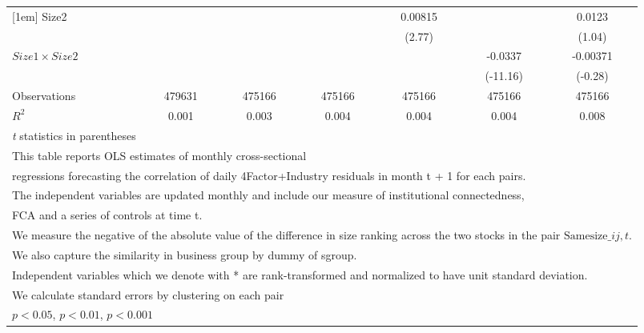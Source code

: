 {\begin{tabular}{l*{6}{c}}
[1em]
Size2               &                     &                     &                     &     0.00815\sym{**} &                     &      0.0123         \\
                    &                     &                     &                     &      (2.77)         &                     &      (1.04)         \\
[1em]
$ Size1 \times Size2 $&                     &                     &                     &                     &     -0.0337\sym{***}&    -0.00371         \\
                    &                     &                     &                     &                     &    (-11.16)         &     (-0.28)         \\
\hline
Observations        &      479631         &      475166         &      475166         &      475166         &      475166         &      475166         \\
\(R^{2}\)           &       0.001         &       0.003         &       0.004         &       0.004         &       0.004         &       0.008         \\
\hline\hline
\multicolumn{7}{l}{\footnotesize \textit{t} statistics in parentheses}\\
\multicolumn{7}{l}{\footnotesize This table reports OLS estimates of monthly cross-sectional}\\
\multicolumn{7}{l}{\footnotesize  regressions forecasting the correlation of daily 4Factor+Industry residuals in month t + 1 for each pairs.}\\
\multicolumn{7}{l}{\footnotesize The independent variables are updated monthly and include our measure of institutional connectedness,}\\
\multicolumn{7}{l}{\footnotesize  FCA and a series of controls at time t.}\\
\multicolumn{7}{l}{\footnotesize We measure the negative of the absolute value of the difference in size ranking across the two stocks in the pair $ \text{Samesize}\_{ij,t} $.}\\
\multicolumn{7}{l}{\footnotesize We also capture the similarity in business group by dummy of sgroup.}\\
\multicolumn{7}{l}{\footnotesize Independent variables which  we denote with * are rank-transformed and normalized to have unit standard deviation.}\\
\multicolumn{7}{l}{\footnotesize  We calculate standard errors by clustering on each pair}\\
\multicolumn{7}{l}{\footnotesize \sym{*} \(p<0.05\), \sym{**} \(p<0.01\), \sym{***} \(p<0.001\)}\\
\end{tabular}
}
